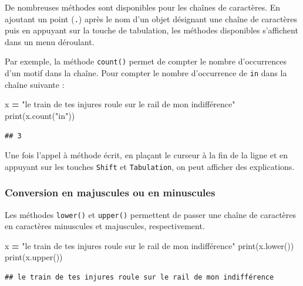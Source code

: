 \documentclass[12pt,]{book}
\newenvironment{Shaded}{\begin{snugshade}}{\end{snugshade}}
\newcommand{\StringTok}[1]{\textcolor[rgb]{0.31,0.60,0.02}{#1}}
\newcommand{\OperatorTok}[1]{\textcolor[rgb]{0.81,0.36,0.00}{\textbf{#1}}}
\newcommand{\BuiltInTok}[1]{#1}
\newcommand{\NormalTok}[1]{#1}
\numberwithin{equation}{section}
\numberwithin{countremarque}{section}
\let\BeginKnitrBlock\begin \let\EndKnitrBlock\end
\begin{document}
De nombreuses méthodes sont disponibles pour les chaînes de caractères.
En ajoutant un point (\texttt{.}) après le nom d'un objet désignant une
chaîne de caractères puis en appuyant sur la touche de tabulation, les
méthodes disponibles s'affichent dans un menu déroulant.

Par exemple, la méthode \texttt{count()} permet de compter le nombre
d'occurrences d'un motif dans la chaîne. Pour compter le nombre
d'occurrence de \texttt{in} dans la chaîne suivante :

\begin{Shaded}
\begin{Highlighting}[]
\NormalTok{x }\OperatorTok{=} \StringTok{"le train de tes injures roule sur le rail de mon indifférence"}
\BuiltInTok{print}\NormalTok{(x.count(}\StringTok{"in"}\NormalTok{))}
\end{Highlighting}
\end{Shaded}

\begin{lstlisting}
## 3
\end{lstlisting}

\BeginKnitrBlock{remarque}
Une fois l'appel à méthode écrit, en plaçant le curseur à la fin de la
ligne et en appuyant sur les touches \texttt{Shift} et
\texttt{Tabulation}, on peut afficher des explications.
\EndKnitrBlock{remarque}

\subsubsection{Conversion en majuscules ou en
minuscules}\label{conversion-en-majuscules-ou-en-minuscules}

Les méthodes \texttt{lower()} et \texttt{upper()} permettent de passer
une chaîne de caractères en caractères minuscules et majuscules,
respectivement.

\begin{Shaded}
\begin{Highlighting}[]
\NormalTok{x }\OperatorTok{=} \StringTok{"le train de tes injures roule sur le rail de mon indifférence"}
\BuiltInTok{print}\NormalTok{(x.lower())}
\BuiltInTok{print}\NormalTok{(x.upper())}
\end{Highlighting}
\end{Shaded}

\begin{lstlisting}
## le train de tes injures roule sur le rail de mon indifférence
\end{lstlisting}
\end{document}
